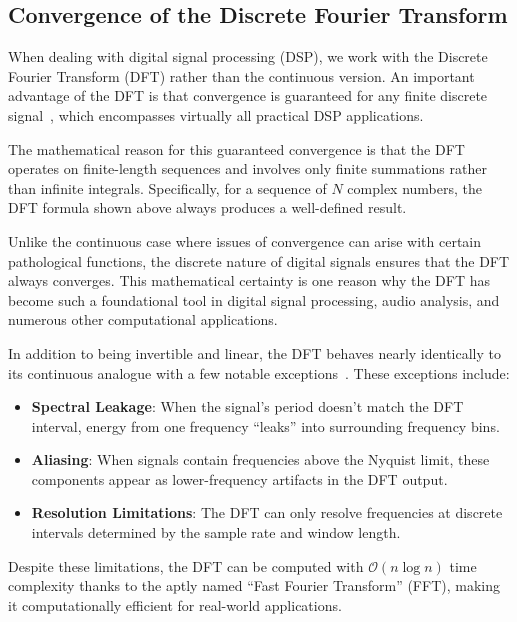 \documentclass[11pt,twoside]{report}
\numberwithin{thm}{section}
\numberwithin{equation}{section}
\begin{document}
\subsection{Convergence of the Discrete Fourier Transform}

When dealing with digital signal processing (DSP), we work with the Discrete Fourier Transform (DFT) rather than the continuous version. An important advantage of the DFT is that convergence is guaranteed for any finite discrete signal~\cite{Lai-Man_2022}, which encompasses virtually all practical DSP applications.

The mathematical reason for this guaranteed convergence is that the DFT operates on finite-length sequences and involves only finite summations rather than infinite integrals. Specifically, for a sequence of $N$ complex numbers, the DFT formula shown above always produces a well-defined result.

Unlike the continuous case where issues of convergence can arise with certain pathological functions, the discrete nature of digital signals ensures that the DFT always converges. This mathematical certainty is one reason why the DFT has become such a foundational tool in digital signal processing, audio analysis, and numerous other computational applications.

In addition to being invertible and linear, the DFT behaves nearly identically to its continuous analogue with a few notable exceptions~\cite{Benson_2006}. These exceptions include:

\begin{itemize}
    \item \textbf{Spectral Leakage}: When the signal's period doesn't match the DFT interval, energy from one frequency ``leaks'' into surrounding frequency bins.
    
    \item \textbf{Aliasing}: When signals contain frequencies above the Nyquist limit, these components appear as lower-frequency artifacts in the DFT output.
    
    \item \textbf{Resolution Limitations}: The DFT can only resolve frequencies at discrete intervals determined by the sample rate and window length.
\end{itemize}

Despite these limitations, the DFT can be computed with $\mathcal{O}(n\log n)$ time complexity thanks to the aptly named ``Fast Fourier Transform'' (FFT), making it computationally efficient for real-world applications.
\end{document}
